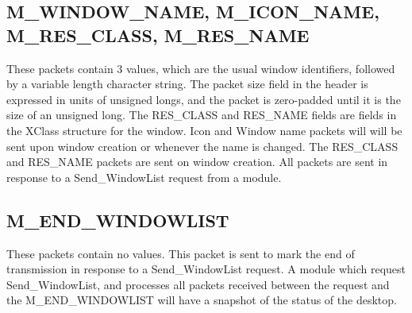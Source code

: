 \subsection{M\_WINDOW\_NAME, M\_ICON\_NAME, M\_RES\_CLASS, M\_RES\_NAME}
These packets contain 3 values, which are the usual window
identifiers, followed by a variable length character string. The
packet size field in the header is expressed in units of unsigned
longs, and the packet is zero-padded until it is the  size of an
unsigned long. The RES\_CLASS and RES\_NAME fields are fields in the
XClass structure for the window. Icon and Window name packets will
will be sent upon window creation or whenever the name is changed. The
RES\_CLASS and RES\_NAME packets are sent on window creation. All
packets are sent in response to a Send\_WindowList request from a module.

\subsection{M\_END\_WINDOWLIST}
These packets contain no values. This packet is sent to mark the end
of transmission in response to  a Send\_WindowList request. A module
which request Send\_WindowList, and processes all packets received
between the request and the M\_END\_WINDOWLIST will have a snapshot of
the status of the desktop.





